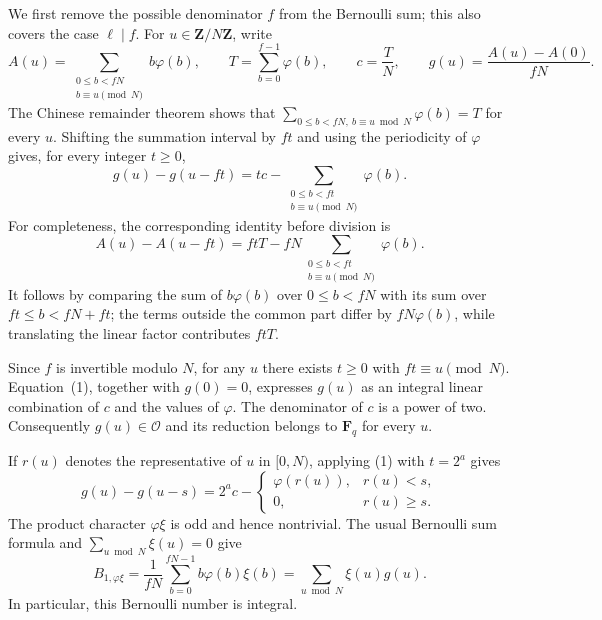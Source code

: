 \documentclass[11pt,a4paper]{article}
\theoremstyle{remark}
\begin{document}
We first remove the possible denominator $f$ from the Bernoulli sum;
this also covers the case $\ell\mid f$.  For $u\in\mathbf Z/N\mathbf Z$,
write
\[
 A(u)=\sum_{\substack{0\leq b<fN\\ b\equiv u\pmod N}}b\varphi(b),
 \qquad
 T=\sum_{b=0}^{f-1}\varphi(b),
 \qquad
 c=\frac{T}{N},
 \qquad
 g(u)=\frac{A(u)-A(0)}{fN}.
\]
The Chinese remainder theorem shows that
$\sum_{0\leq b<fN,\ b\equiv u\bmod N}\varphi(b)=T$ for every $u$.
Shifting the summation interval by $ft$ and using the periodicity of
$\varphi$ gives, for every integer $t\geq0$,
\[
 g(u)-g(u-ft)
 =tc-\sum_{\substack{0\leq b<ft\\b\equiv u\pmod N}}\varphi(b).
 \tag{1}
\]
For completeness, the corresponding identity before division is
\[
 A(u)-A(u-ft)
 =ftT-fN\sum_{\substack{0\leq b<ft\\b\equiv u\pmod N}}\varphi(b).
\]
It follows by comparing the sum of $b\varphi(b)$ over
$0\leq b<fN$ with its sum over $ft\leq b<fN+ft$; the terms outside
the common part differ by $fN\varphi(b)$, while translating the
linear factor contributes $ftT$.

Since $f$ is invertible modulo $N$, for any $u$ there exists $t\geq0$
with $ft\equiv u\pmod N$.  Equation~(1), together with $g(0)=0$,
expresses $g(u)$ as an integral linear combination of $c$ and the
values of $\varphi$.  The denominator of $c$ is a power of two.
Consequently $g(u)\in\mathcal O$ and its reduction belongs to
$\mathbf F_q$ for every $u$.

If $r(u)$ denotes the representative of $u$ in $[0,N)$, applying
(1) with $t=2^a$ gives
\[
 g(u)-g(u-s)
 =2^ac-
 \begin{cases}
   \varphi(r(u)),&r(u)<s,\\
   0,&r(u)\geq s.
 \end{cases}
 \tag{2}
\]
The product character $\varphi\xi$ is odd and hence nontrivial.
The usual Bernoulli sum formula and $\sum_{u\bmod N}\xi(u)=0$ give
\[
 B_{1,\varphi\xi}
 =\frac1{fN}\sum_{b=0}^{fN-1}b\varphi(b)\xi(b)
 =\sum_{u\bmod N}\xi(u)g(u).
 \tag{3}
\]
In particular, this Bernoulli number is integral.
\end{document}
